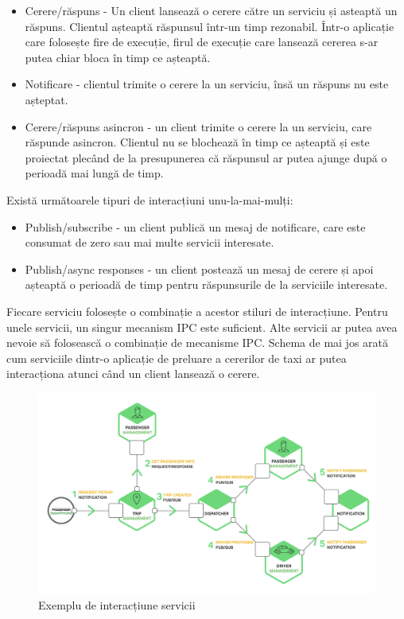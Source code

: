 \documentclass[12pt, a4paper, oneside, romanian]{teza-upb}
\begin{document}
\begin{itemize}
 \item Cerere/răspuns - Un client lansează o cerere către un serviciu și asteaptă un răspuns. Clientul așteaptă răspunsul într-un timp rezonabil. Într-o aplicație care folosește fire de execuție, firul de execuție care lansează cererea s-ar putea chiar bloca în timp ce așteaptă. 
 \item Notificare - clientul trimite o cerere la un serviciu, însă un răspuns nu este așteptat.
 \item Cerere/răspuns asincron - un client trimite o cerere la un serviciu, care răspunde asincron. Clientul nu se blochează în timp ce așteaptă și este proiectat plecând de la presupunerea că răspunsul ar putea ajunge după o perioadă mai lungă de timp.
\end{itemize}
 
Există următoarele tipuri de interacțiuni unu-la-mai-mulți:

\begin{itemize}
	\item Publish/subscribe - un client publică un mesaj de notificare, care este consumat de zero sau mai multe servicii interesate.
	\item Publish/async responses - un client postează un mesaj de cerere și apoi așteaptă o perioadă de timp pentru răspunsurile de la serviciile interesate. 
\end{itemize}

Fiecare serviciu folosește o combinație a acestor stiluri de interacțiune. Pentru unele servicii, un singur mecanism IPC este suficient. Alte servicii ar putea avea nevoie să folosească o combinație de mecanisme IPC. Schema de mai jos arată cum serviciile dintr-o aplicație de preluare a cererilor de taxi ar putea interacționa atunci când un client lansează o cerere. 

\begin{figure}[ht]
\centering
\includegraphics[scale=0.15]{img/Richardson-microservices-part3-taxi-service.png}
\caption{Exemplu de interacțiune servicii}
\label{fig:arhi_componente}
\end{figure}
\end{document}
